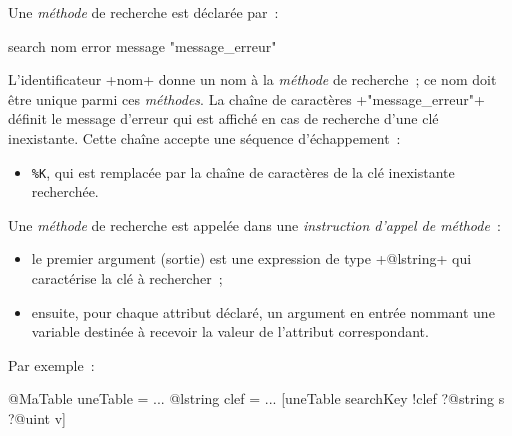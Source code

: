 Une \emph{méthode} de recherche est déclarée par~:


\begin{galgas}
search nom error message "message_erreur"
\end{galgas}

L'identificateur \ggs+nom+ donne un nom à la \emph{méthode} de recherche~; ce nom doit être unique parmi ces \emph{méthodes}. La chaîne de caractères \ggs+"message_erreur"+ définit le message d'erreur qui est affiché en cas de recherche d'une clé inexistante. Cette chaîne accepte une séquence d'échappement~:
\begin{itemize}
  \item \texttt{\%K}, qui est remplacée par la chaîne de caractères de la clé inexistante recherchée.
\end{itemize}


Une \emph{méthode} de recherche est appelée dans une \emph{instruction d'appel de méthode}~:
\begin{itemize}
  \item le premier argument (sortie) est une expression de type \ggs+@lstring+ qui caractérise la clé à rechercher~;
  \item ensuite, pour chaque attribut déclaré, un argument en entrée nommant une variable destinée à recevoir la valeur de l'attribut correspondant.
\end{itemize}

Par exemple~:
\begin{galgas}
@MaTable uneTable = {}
...
@lstring clef = ...
[uneTable searchKey !clef ?@string s ?@uint v]
\end{galgas}


%
%
%
%
%







